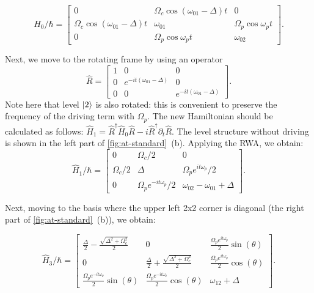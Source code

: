 \documentclass[%
 aps, prx,
 amsmath,amssymb,
 reprint,%
superscriptaddress
]{revtex4-2}
\begin{document}
\begin{equation*}
\hat H_0/\hbar = \left[\begin{matrix}
0 & \Omega_{c} \cos{\left(\omega_{01}- \Delta \right)t} & 0\\
\Omega_{c} \cos{\left(\omega_{01} - \Delta \right)t}   & \omega_{01} &\Omega_{p} \cos\omega_p t  \\
0 & \Omega_{p} \cos{\omega_p t}  & \omega_{02}\end{matrix}\right].
\end{equation*}

Next, we move to the rotating frame by using an operator
\[
\hat R = \left[\begin{matrix} 
1 & 0 & 0\\0 & e^{- i t \left(\omega_{01}- \Delta\right)} & 0\\0 & 0 & e^{- i t \left(\omega_{01}- \Delta\right)}\end{matrix}\right].
\]
Note here that level $\ket{2}$ is also rotated: this is convenient to preserve the frequency of the driving term with $\Omega_p$. The new Hamiltonian should be calculated as follows: $\hat H_1 = \hat R^\dag \hat H_0 \hat R - i \hat{R}^\dag \partial_t  \hat R$. The level structure without driving  is shown in the left part of \autoref{fig:at-standard}~(b). Applying the RWA, we obtain:
\begin{equation*}
\hat H_1/\hbar = \left[\begin{matrix}0 &\Omega_{c}/2 & 0\\\Omega_{c}/2 & \Delta & \Omega_{p} e^{i t \omega_p}/2\\0 & \Omega_{p} e^{-i t \omega_p}/2 & \omega_{02} - \omega_{01}+\Delta \end{matrix}\right].
\end{equation*}

Next, moving to the basis where the upper left 2x2 corner is diagonal (the right part of \autoref{fig:at-standard}~(b)), we obtain:

\begin{equation*}
\hat H_3/\hbar = \left[\begin{matrix} 
\frac{\Delta}{2} - \frac{\sqrt{\Delta^{2} + \Omega_{c}^{2}}}{2} & 
0 &
\frac{\Omega_{p} e^{i t \omega_{p}}}{2}\sin(\theta)
\\
0 & 
\frac{\Delta}{2} + \frac{\sqrt{\Delta^{2} + \Omega_{c}^{2}}}{2} & 
\frac{\Omega_{p} e^ {i t \omega_p}}{2}\cos(\theta)
\\
\frac{\Omega_{p} e^{-i t \omega_{p}} }{2}\sin(\theta) & 
\frac{\Omega_{p} e^{-i t \omega_{p}}}{2} \cos(\theta) & 
\omega_{12} +\Delta 
\end{matrix}\right].
\end{equation*}
\end{document}
